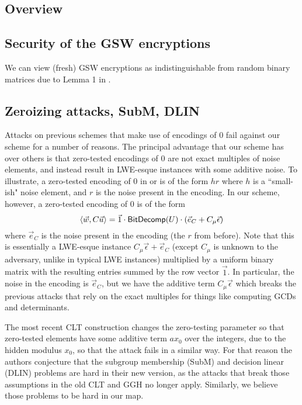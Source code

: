 \subsection{Overview}


\subsection{Security of the GSW encryptions}   
We can view (fresh) GSW encryptions as indistinguishable from random binary matrices due to Lemma 1 in \cite{gsw}.

\subsection{Zeroizing attacks, SubM, DLIN}
Attacks on previous schemes \cite{chl,cgh,hj} that make use of encodings of 0 fail against our scheme for a number of reasons. The principal advantage that our scheme has over others is that zero-tested encodings of $0$ are not exact multiples of noise elements, and instead result in LWE-esque instances with some additive noise.  To illustrate, a zero-tested encoding of $0$ in \cite{clt} or \cite{ggh13a} is of the form $hr$ where $h$ is a ``small-ish" noise element, and $r$ is the noise present in the encoding.  In our scheme, however, a zero-tested encoding of $0$ is of the form
$$\left<\vec{w}, C \vec{u}\right> = \vec{1}\cdot \mathsf{BitDecomp}(U)\cdot (\vec{e}_C + C_\mu\vec{\epsilon})$$
where $\vec{e}_C$ is the noise present in the encoding (the $r$ from before).  Note that this is essentially a LWE-esque instance $C_\mu\vec{\epsilon} + \vec{e}_C$ (except $C_\mu$ is unknown to the adversary, unlike in typical LWE instances) multiplied by a uniform binary matrix with the resulting entries summed by the row vector $\vec{1}$.  In particular, the noise in the encoding is $\vec{e}_C$, but we have the additive term $C_\mu\vec{\epsilon}$ which breaks the previous attacks that rely on the exact multiples for things like computing GCDs and determinants. 

The most recent CLT construction \cite{clt15} changes the zero-testing parameter so that zero-tested elements have some additive term $ax_0$ over the integers, due to the hidden modulus $x_0$, so that the attack fails in a similar way.  For that reason the authors conjecture that the subgroup membership (SubM) and decision linear (DLIN) problems are hard in their new version, as the attacks that break those assumptions in the old CLT and GGH no longer apply.  Similarly, we believe those problems to be hard in our map.


